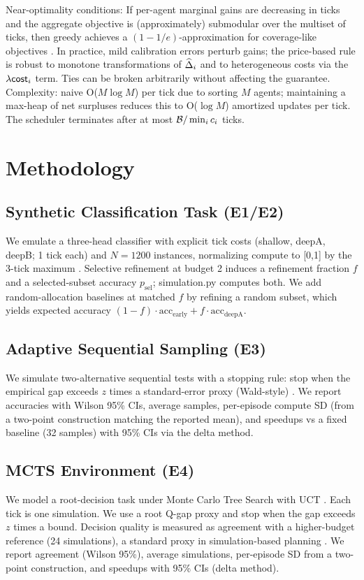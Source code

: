 Near-optimality conditions: If per-agent marginal gains are decreasing in ticks and the aggregate objective is (approximately) submodular over the multiset of ticks, then greedy achieves a $(1-1/e)$-approximation for coverage-like objectives \cite{Nemhauser1978}. In practice, mild calibration errors perturb gains; the price-based rule is robust to monotone transformations of $\widehat{\Delta}_i$ and to heterogeneous costs via the $\lambda \mathsf{cost}_i$ term. Ties can be broken arbitrarily without affecting the guarantee. Complexity: naive O($M\log M$) per tick due to sorting $M$ agents; maintaining a max-heap of net surpluses reduces this to O($\log M$) amortized updates per tick. The scheduler terminates after at most $\mathcal{B}/\min_i c_i$ ticks.

\section{Methodology}
\label{sec:method}
\subsection{Synthetic Classification Task (E1/E2)}
We emulate a three-head classifier with explicit tick costs (shallow, deepA, deepB; 1 tick each) and $N{=}1200$ instances, normalizing compute to [0,1] by the 3-tick maximum \cite{Huang2018MSDNet,Wang2018SkipNet}. Selective refinement at budget 2 induces a refinement fraction $f$ and a selected-subset accuracy $p_{\mathrm{sel}}$; simulation.py computes both. We add random-allocation baselines at matched $f$ by refining a random subset, which yields expected accuracy $(1-f)\cdot \mathrm{acc}_{\text{early}} + f \cdot \mathrm{acc}_{\text{deepA}}$.

\subsection{Adaptive Sequential Sampling (E3)}
We simulate two-alternative sequential tests with a stopping rule: stop when the empirical gap exceeds $z$ times a standard-error proxy (Wald-style) \cite{Wald1945Sequential}. We report accuracies with Wilson 95\% CIs, average samples, per-episode compute SD (from a two-point construction matching the reported mean), and speedups vs a fixed baseline (32 samples) with 95\% CIs via the delta method.

\subsection{MCTS Environment (E4)}
We model a root-decision task under Monte Carlo Tree Search with UCT \cite{Kocsis2006UCT}. Each tick is one simulation. We use a root Q-gap proxy and stop when the gap exceeds $z$ times a bound. Decision quality is measured as agreement with a higher-budget reference (24 simulations), a standard proxy in simulation-based planning \cite{Coulom2006MCTS}. We report agreement (Wilson 95\%), average simulations, per-episode SD from a two-point construction, and speedups with 95\% CIs (delta method).

